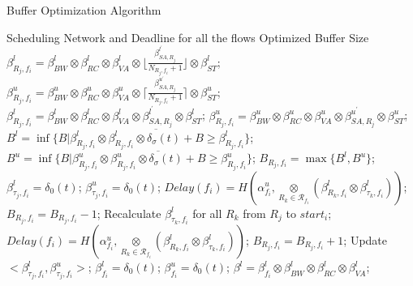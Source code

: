\documentclass[10pt,journal]{IEEEtran}
\begin{document}
\begin{algorithm}
\caption{Buffer Optimization Algorithm}
\label{alg:bufopt}
\begin{algorithmic}[1]
\REQUIRE Scheduling Network and Deadline for all the flows
\ENSURE Optimized Buffer Size
                \STATE $\beta_{R_j,f_i}^l=\beta_{BW}^l\otimes\beta_{RC}^l\otimes\beta_{VA}^l\otimes\lfloor\frac{\beta_{SA,R_j}^{l^\prime}}{N_{R_j,f_i}+1}\rfloor\otimes\beta_{ST}^l$;
                \STATE $\beta_{R_j,f_i}^u=\beta_{BW}^u\otimes\beta_{RC}^u\otimes\beta_{VA}^u\otimes\lceil\frac{\beta_{SA,R_j}^{u^\prime}}{N_{R_j,f_i}+1}\rceil\otimes\beta_{ST}^u$;
            \ELSE
                \STATE $\beta_{R_j,f_i}^l=\beta_{BW}^l\otimes\beta_{RC}^l\otimes\beta_{VA}^l\otimes\beta_{SA,R_j}^{l^\prime}\otimes\beta_{ST}^l$;
                \STATE $\beta_{R_j,f_i}^u=\beta_{BW}^u\otimes\beta_{RC}^u\otimes\beta_{VA}^u\otimes\beta_{SA,R_j}^{u^\prime}\otimes\beta_{ST}^u$;
            \ENDIF
            \STATE $B^l=\inf\{B|\beta_{R_j,f_i}^l\otimes\overline{\beta_{R_j,f_i}^l\otimes\delta_\sigma(t)+B}\geq\beta_{R_j,f_i}^l\}$;
            \STATE $B^u=\inf\{B|\beta_{R_j,f_i}^u\otimes\overline{\beta_{R_j,f_i}^u\otimes\delta_\sigma(t)+B}\geq\beta_{R_j,f_i}^u\}$;
            \STATE $B_{R_j,f_i}=\max\{B^l,B^u\}$;
            \STATE $\beta_{\tau_j,f_i}^l=\delta_0(t)$; $\beta_{\tau_j,f_i}^u=\delta_0(t)$;
        \ENDFOR
            \STATE $Delay(f_i)=H(\alpha^u_{f_i},\underset{R_k\in\mathcal{R}_{f_i}}{\otimes}(\beta^l_{R_k,f_i}\otimes\beta^l_{\tau_k,f_i}))$;
                \STATE $B_{R_j,f_i}=B_{R_j,f_i}-1$;
                \STATE Recalculate $\beta_{\tau_k,f_i}^l$ for all $R_{k}$ from $R_j$ to $start_i$;
                \STATE $Delay(f_i)=H(\alpha^u_{f_i},\underset{R_k\in\mathcal{R}_{f_i}}{\otimes}(\beta^l_{R_k,f_i}\otimes\beta^l_{\tau_k,f_i}))$;
            \ENDWHILE
                \STATE $B_{R_j,f_i}=B_{R_j,f_i}+1$;
                \STATE Update $<\beta_{\tau_j,f_i}^l,\beta_{\tau_j,f_i}^u>$;
            \ENDIF
        \ENDFOR
        \STATE $\beta_{f_i}^l=\delta_0(t)$; $\beta_{f_i}^u=\delta_0(t)$;
            \STATE $\beta^l=\beta^l_{f_i}\otimes\beta_{BW}^l\otimes\beta_{RC}^l\otimes\beta_{VA}^l$;

\end{algorithmic}
\end{algorithm}
\end{document}
